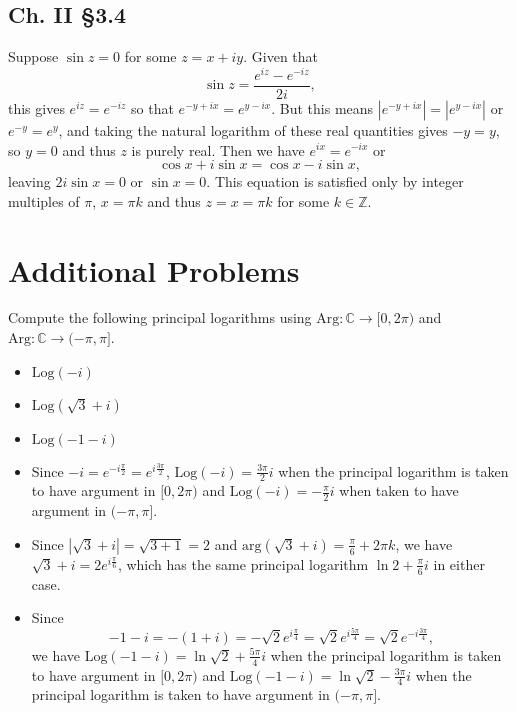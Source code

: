 \documentclass{article}
\newcounter{Problem}
\newenvironment{Problem}{\begin{Exercise}[name={Problem},
                                          counter={Problem}]}
                        {\end{Exercise}}
\begin{document}
\subsection*{Ch. II \S 3.4}
Suppose $\sin z = 0$ for some $z = x + iy$. Given that
$$
\sin z = \frac{e^{iz} - e^{-iz}}{2 i},
$$
this gives $e^{iz} = e^{-iz}$ so that
$e^{-y + ix} = e^{y - ix}$. But this means
$|e^{-y + ix}| = |e^{y - ix}|$ or
$e^{-y} = e^y$, and taking the natural logarithm
of these real quantities gives $-y = y$, so $y = 0$
and thus $z$ is purely real. Then we have
$e^{ix} = e^{-ix}$ or
$$
\cos x + i \sin x = \cos x - i \sin x,
$$
leaving $2 i \sin x = 0$ or $\sin x = 0$. This equation
is satisfied only by integer multiples of $\pi$,
$x = \pi k$ and thus $z = x = \pi k$ for some $k \in \mathbb{Z}$.

\section{Additional Problems}

\begin{Problem}
Compute the following principal logarithms using
$\mathrm{Arg} : \mathbb{C} \to [0, 2\pi)$ and
$\mathrm{Arg} : \mathbb{C} \to (-\pi, \pi]$.
\begin{itemize}
  \item{
    $\mathrm{Log}(-i)$
  }
  \item{
    $\mathrm{Log}(\sqrt{3} + i)$
  }
  \item{
    $\mathrm{Log}(-1 - i)$
  }
\end{itemize}
\end{Problem}

\begin{Answer}
  \begin{itemize}
    \item{
      Since $-i = e^{-i \frac{\pi}{2}} = e^{i \frac{3 \pi}{2}}$,
      $\mathrm{Log}(-i) = \frac{3 \pi}{2}i$ when the principal logarithm
      is taken to have argument in $[0, 2 \pi)$ and
      $\mathrm{Log}(-i) = -\frac{\pi}{2}i$ when
      taken to have argument in $(-\pi, \pi]$.
    }
    \item{
      Since $|\sqrt{3} + i| = \sqrt{3 + 1} = 2$ and
      $\mathrm{arg}(\sqrt{3} + i) = \frac{\pi}{6} + 2 \pi k$,
      we have $\sqrt{3} + i  = 2e^{i\frac{\pi}{6}}$, which has the
      same principal logarithm $\ln 2 + \frac{\pi}{6} i$ in either case.
    }
    \item{
      Since
      $$
        -1 - i
      = -(1 + i)
      = -\sqrt{2}e^{i\frac{\pi}{4}}
      = \sqrt{2}e^{i\frac{5 \pi}{4}}
      = \sqrt{2}e^{-i\frac{3 \pi}{4}},
      $$
      we have $\mathrm{Log}(-1 - i) = \ln \sqrt{2} + \frac{5 \pi}{4}i$
      when the principal logarithm is taken to have argument in
      $[0, 2 \pi)$ and $\mathrm{Log}(-1 - i) = \ln \sqrt{2} - \frac{3 \pi}{4}i$
      when the principal logarithm is taken to have argument in $(-\pi, \pi]$.
    }
  \end{itemize}
\end{Answer}
\end{document}
